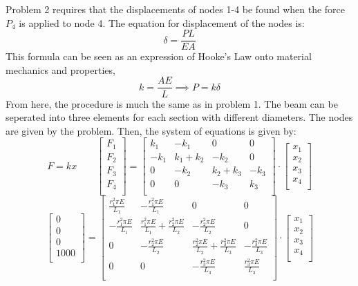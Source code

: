 \documentclass[8pt]{article}
\begin{document}
Problem 2 requires that the displacements of nodes 1-4 be found when the force \( P_4 \) is applied to node 4. The equation for displacement of the nodes is:
\[
\delta = \frac{PL}{EA}
\]
This formula can be seen as an expression of Hooke's Law onto material mechanics and properties, 
\[
k = \frac{AE}{L} \implies P = k\delta
\]
From here, the procedure is much the same as in problem 1. The beam can be seperated into three elements for each section with different diameters. The nodes are given by the problem. Then, the system of equations is given by:
\[
F = kx
\quad
\quad
\begin{bmatrix}
    F_1 \\ 
    F_2 \\ 
    F_3 \\ 
    F_4 \\
\end{bmatrix}
=
\begin{bmatrix}
    k_1 & -k_1 & 0 & 0 \\
    -k_1 & k_1 + k_2 & -k_2 & 0 \\
    0 & -k_2 & k_2 + k_3 & -k_3 \\
    0 & 0 & -k_3 & k_3 \\
\end{bmatrix}
\cdot
\begin{bmatrix}
    x_1 \\ 
    x_2 \\ 
    x_3 \\ 
    x_4 \\
\end{bmatrix}
\]
\[
\begin{bmatrix}
    0 \\ 
    0 \\ 
    0 \\ 
    1000 \\
\end{bmatrix}
=
\begin{bmatrix}
\frac{r_1^2 \pi E}{L_1} & -\frac{r_1^2 \pi E}{L_1} & 0 & 0 \\
-\frac{r_1^2 \pi E}{L_1} & \frac{r_1^2 \pi E}{L_1} + \frac{r_2^2 \pi E}{L_2} & -\frac{r_2^2 \pi E}{L_2} & 0 \\
0 & -\frac{r_2^2 \pi E}{L_2} & \frac{r_2^2 \pi E}{L_2} + \frac{r_3^2 \pi E}{L_3} & -\frac{r_3^2 \pi E}{L_3} \\
0 & 0 & -\frac{r_3^2 \pi E}{L_3} & \frac{r_3^2 \pi E}{L_3} \\
\end{bmatrix}
\cdot
\begin{bmatrix}
    x_1 \\ 
    x_2 \\ 
    x_3 \\ 
    x_4 \\
\end{bmatrix}
\]
\end{document}
